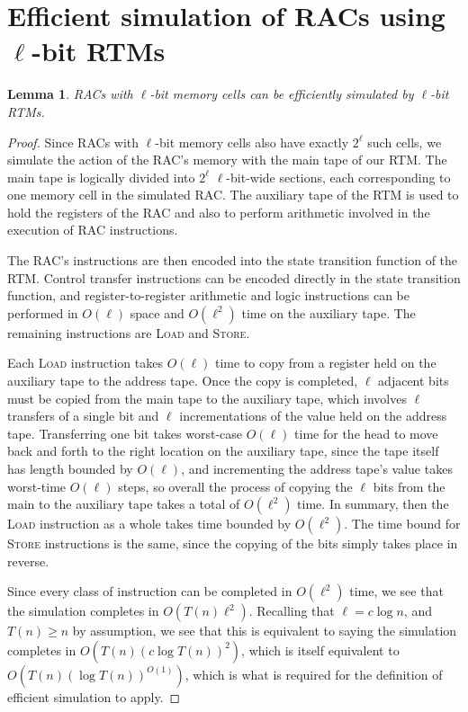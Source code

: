 \documentclass[english]{article}
\theoremstyle{plain}
\theoremstyle{definition}
\theoremstyle{plain}
\newtheorem{lem}[thm]{Lemma}
\begin{document}
\section{Efficient simulation of RACs using $\ell$-bit RTMs}

\begin{lem}
  RACs with $\ell$-bit memory cells can be efficiently simulated by
  $\ell$-bit RTMs.
\end{lem}

\begin{proof}
  Since RACs with $\ell$-bit memory cells also have exactly $2^\ell$
  such cells, we simulate the action of the RAC's memory with the main
  tape of our RTM. The main tape is logically divided into $2^\ell$
  $\ell$-bit-wide sections, each corresponding to one memory cell in
  the simulated RAC. The auxiliary tape of the RTM is used to hold the
  registers of the RAC and also to perform arithmetic involved in the
  execution of RAC instructions.

  The RAC's instructions are then encoded into the state transition
  function of the RTM. Control transfer instructions can be encoded
  directly in the state transition function, and register-to-register
  arithmetic and logic instructions can be performed in $O(\ell)$
  space and $O(\ell^2)$ time on the auxiliary tape. The remaining
  instructions are \textsc{Load} and \textsc{Store}.

  Each \textsc{Load} instruction takes $O(\ell)$ time to copy from a
  register held on the auxiliary tape to the address tape. Once the
  copy is completed, $\ell$ adjacent bits must be copied from the main
  tape to the auxiliary tape, which involves $\ell$ transfers of a
  single bit and $\ell$ incrementations of the value held on the
  address tape. Transferring one bit takes worst-case $O(\ell)$ time
  for the head to move back and forth to the right location on the
  auxiliary tape, since the tape itself has length bounded by
  $O(\ell)$, and incrementing the address tape's value takes
  worst-time $O(\ell)$ steps, so overall the process of copying the
  $\ell$ bits from the main to the auxiliary tape takes a total of
  $O(\ell^2)$ time. In summary, then the \textsc{Load} instruction as
  a whole takes time bounded by $O(\ell^2)$. The time bound for
  \textsc{Store} instructions is the same, since the copying of the
  bits simply takes place in reverse.

  Since every class of instruction can be completed in $O(\ell^2)$
  time, we see that the simulation completes in $O(T(n)
  \ell^2)$. Recalling that $\ell=c \log n$, and $T(n) \geq n$ by
  assumption, we see that this is equivalent to saying the simulation
  completes in $O(T(n) (c \log T(n))^2)$, which is itself equivalent
  to $O(T(n)(\log T(n))^{O(1)})$, which is what is required for the
  definition of efficient simulation to apply.
\end{proof}
\end{document}
